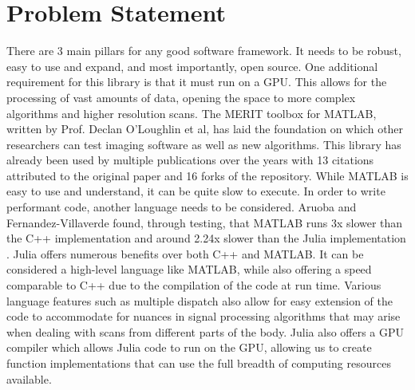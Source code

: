 \section*{Problem Statement}
There are 3 main pillars for any good software framework. It needs to be robust, easy to use and expand, and most importantly, open source. One additional requirement for this library is that it must run on a GPU. This allows for the processing of vast amounts of data, opening the space to more complex algorithms and higher resolution scans. The MERIT toolbox for MATLAB, written by Prof. Declan O'Loughlin et al, has laid the foundation on which other researchers can test imaging software as well as new algorithms. This library has already been used by multiple publications over the years with 13 citations attributed to the original paper and 16 forks of the repository. While MATLAB is easy to use and understand, it can be quite slow to execute. In order to write performant code, another language needs to be considered. Aruoba and Fernandez-Villaverde found, through testing, that MATLAB runs 3x slower than the C++ implementation and around 2.24x slower than the Julia implementation \cite{RN3}. Julia offers numerous benefits over both C++ and MATLAB. It can be considered a high-level language like MATLAB, while also offering a speed comparable to C++ due to the compilation of the code at run time. Various language features such as multiple dispatch also allow for easy extension of the code to accommodate for nuances in signal processing algorithms that may arise when dealing with scans from different parts of the body. Julia also offers a GPU compiler which allows Julia code to run on the GPU, allowing us to create function implementations that can use the full breadth of computing resources available.